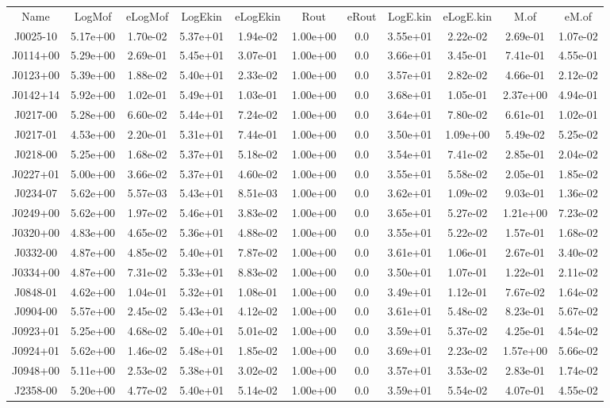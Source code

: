 \begin{table}
\begin{tabular}{ccccccccccc}
Name & LogMof & eLogMof & LogEkin & eLogEkin & Rout & eRout & LogE.kin & eLogE.kin & M.of & eM.of \\
J0025-10 & 5.17e+00 & 1.70e-02 & 5.37e+01 & 1.94e-02 & 1.00e+00 & 0.0 & 3.55e+01 & 2.22e-02 & 2.69e-01 & 1.07e-02 \\
J0114+00 & 5.29e+00 & 2.69e-01 & 5.45e+01 & 3.07e-01 & 1.00e+00 & 0.0 & 3.66e+01 & 3.45e-01 & 7.41e-01 & 4.55e-01 \\
J0123+00 & 5.39e+00 & 1.88e-02 & 5.40e+01 & 2.33e-02 & 1.00e+00 & 0.0 & 3.57e+01 & 2.82e-02 & 4.66e-01 & 2.12e-02 \\
J0142+14 & 5.92e+00 & 1.02e-01 & 5.49e+01 & 1.03e-01 & 1.00e+00 & 0.0 & 3.68e+01 & 1.05e-01 & 2.37e+00 & 4.94e-01 \\
J0217-00 & 5.28e+00 & 6.60e-02 & 5.44e+01 & 7.24e-02 & 1.00e+00 & 0.0 & 3.64e+01 & 7.80e-02 & 6.61e-01 & 1.02e-01 \\
J0217-01 & 4.53e+00 & 2.20e-01 & 5.31e+01 & 7.44e-01 & 1.00e+00 & 0.0 & 3.50e+01 & 1.09e+00 & 5.49e-02 & 5.25e-02 \\
J0218-00 & 5.25e+00 & 1.68e-02 & 5.37e+01 & 5.18e-02 & 1.00e+00 & 0.0 & 3.54e+01 & 7.41e-02 & 2.85e-01 & 2.04e-02 \\
J0227+01 & 5.00e+00 & 3.66e-02 & 5.37e+01 & 4.60e-02 & 1.00e+00 & 0.0 & 3.55e+01 & 5.58e-02 & 2.05e-01 & 1.85e-02 \\
J0234-07 & 5.62e+00 & 5.57e-03 & 5.43e+01 & 8.51e-03 & 1.00e+00 & 0.0 & 3.62e+01 & 1.09e-02 & 9.03e-01 & 1.36e-02 \\
J0249+00 & 5.62e+00 & 1.97e-02 & 5.46e+01 & 3.83e-02 & 1.00e+00 & 0.0 & 3.65e+01 & 5.27e-02 & 1.21e+00 & 7.23e-02 \\
J0320+00 & 4.83e+00 & 4.65e-02 & 5.36e+01 & 4.88e-02 & 1.00e+00 & 0.0 & 3.55e+01 & 5.22e-02 & 1.57e-01 & 1.68e-02 \\
J0332-00 & 4.87e+00 & 4.85e-02 & 5.40e+01 & 7.87e-02 & 1.00e+00 & 0.0 & 3.61e+01 & 1.06e-01 & 2.67e-01 & 3.40e-02 \\
J0334+00 & 4.87e+00 & 7.31e-02 & 5.33e+01 & 8.83e-02 & 1.00e+00 & 0.0 & 3.50e+01 & 1.07e-01 & 1.22e-01 & 2.11e-02 \\
J0848-01 & 4.62e+00 & 1.04e-01 & 5.32e+01 & 1.08e-01 & 1.00e+00 & 0.0 & 3.49e+01 & 1.12e-01 & 7.67e-02 & 1.64e-02 \\
J0904-00 & 5.57e+00 & 2.45e-02 & 5.43e+01 & 4.12e-02 & 1.00e+00 & 0.0 & 3.61e+01 & 5.48e-02 & 8.23e-01 & 5.67e-02 \\
J0923+01 & 5.25e+00 & 4.68e-02 & 5.40e+01 & 5.01e-02 & 1.00e+00 & 0.0 & 3.59e+01 & 5.37e-02 & 4.25e-01 & 4.54e-02 \\
J0924+01 & 5.62e+00 & 1.46e-02 & 5.48e+01 & 1.85e-02 & 1.00e+00 & 0.0 & 3.69e+01 & 2.23e-02 & 1.57e+00 & 5.66e-02 \\
J0948+00 & 5.11e+00 & 2.53e-02 & 5.38e+01 & 3.02e-02 & 1.00e+00 & 0.0 & 3.57e+01 & 3.53e-02 & 2.83e-01 & 1.74e-02 \\
J2358-00 & 5.20e+00 & 4.77e-02 & 5.40e+01 & 5.14e-02 & 1.00e+00 & 0.0 & 3.59e+01 & 5.54e-02 & 4.07e-01 & 4.55e-02 \\
\end{tabular}
\end{table}
